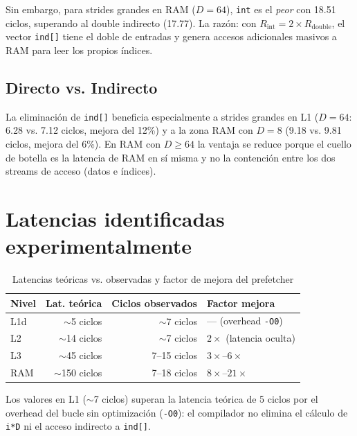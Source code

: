 \documentclass[12pt,a4paper]{article}
\begin{document}
Sin embargo, para strides grandes en RAM ($D=64$), \texttt{int} es el \emph{peor} con 18.51 ciclos, superando al double indirecto (17.77).
La razón: con $R_{\text{int}} = 2 \times R_{\text{double}}$, el vector \texttt{ind[]} tiene el doble de entradas y genera accesos adicionales masivos a RAM para leer los propios índices.

\subsection{Directo vs. Indirecto}

La eliminación de \texttt{ind[]} beneficia especialmente a strides grandes en L1 ($D=64$: 6.28 vs. 7.12 ciclos, mejora del 12\%) y a la zona RAM con $D=8$ (9.18 vs. 9.81 ciclos, mejora del 6\%).
En RAM con $D \geq 64$ la ventaja se reduce porque el cuello de botella es la latencia de RAM en sí misma y no la contención entre los dos streams de acceso (datos e índices).

\section{Latencias identificadas experimentalmente}

\begin{table}[H]
\centering
\caption{Latencias teóricas vs. observadas y factor de mejora del prefetcher}
\label{tab:latencias}
\begin{tabular}{lrrl}
\toprule
\textbf{Nivel} & \textbf{Lat. teórica} & \textbf{Ciclos observados} & \textbf{Factor mejora} \\
\midrule
L1d  & $\sim$5 ciclos   & $\sim$7 ciclos   & --- (overhead \texttt{-O0}) \\
L2   & $\sim$14 ciclos  & $\sim$7 ciclos   & $2\times$ (latencia oculta) \\
L3   & $\sim$45 ciclos  & 7--15 ciclos     & $3\times$--$6\times$ \\
RAM  & $\sim$150 ciclos & 7--18 ciclos     & $8\times$--$21\times$ \\
\bottomrule
\end{tabular}
\end{table}

Los valores en L1 ($\sim$7 ciclos) superan la latencia teórica de 5 ciclos por el overhead del bucle sin optimización (\texttt{-O0}): el compilador no elimina el cálculo de \texttt{i*D} ni el acceso indirecto a \texttt{ind[]}.
\end{document}
